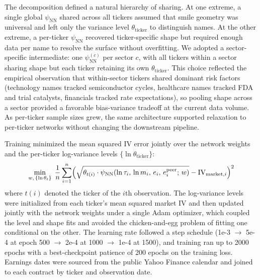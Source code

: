 The decomposition defined a natural hierarchy of sharing. At one extreme, a single global $\psi_{\text{NN}}$ shared across all tickers assumed that smile geometry was universal and left only the variance level $\theta_{\text{ticker}}$ to distinguish names. At the other extreme, a per-ticker $\psi_{\text{NN}}$ recovered ticker-specific shape but required enough data per name to resolve the surface without overfitting. We adopted a sector-specific intermediate: one $\psi_{\text{NN}}^{(c)}$ per sector $c$, with all tickers within a sector sharing shape but each ticker retaining its own $\theta_{\text{ticker}}$. This choice reflected the empirical observation that within-sector tickers shared dominant risk factors (technology names tracked semiconductor cycles, healthcare names tracked FDA and trial catalysts, financials tracked rate expectations), so pooling shape across a sector provided a favorable bias-variance tradeoff at the current data volume. As per-ticker sample sizes grew, the same architecture supported relaxation to per-ticker networks without changing the downstream pipeline.

Training minimized the mean squared IV error jointly over the network weights and the per-ticker log-variance levels $\{\ln\theta_{\text{ticker}}\}$:
\begin{equation}\label{eq:nn_loss}
    \min_{w,\,\{\ln\theta_t\}} \;\frac{1}{n} \sum_{i=1}^{n} \Bigl(\sqrt{\theta_{t(i)} \cdot \psi_{\text{NN}}(\ln\tau_i,\,\ln m_i,\,e_i,\,e^{\text{peer}}_i;\,w)} - \text{IV}_{\text{market},i}\Bigr)^2
\end{equation}
where $t(i)$ denoted the ticker of the $i$th observation. The log-variance levels were initialized from each ticker's mean squared market IV and then updated jointly with the network weights under a single Adam optimizer, which coupled the level and shape fits and avoided the chicken-and-egg problem of fitting one conditional on the other. The learning rate followed a step schedule (1\mbox{e-3} $\to$ 5\mbox{e-4} at epoch 500 $\to$ 2\mbox{e-4} at 1000 $\to$ 1\mbox{e-4} at 1500), and training ran up to 2000 epochs with a best-checkpoint patience of 200 epochs on the training loss. Earnings dates were sourced from the public Yahoo Finance calendar and joined to each contract by ticker and observation date.
